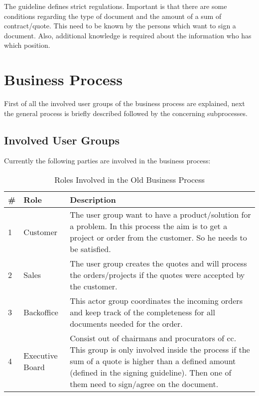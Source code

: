 The guideline defines strict regulations. Important is that there are some conditions regarding the type of document and the amount of a sum of contract/quote. This need to be known by the persons which want to sign a document. Also, additional knowledge is required about the information who has which position.

\section{Business Process} \label{sec:bp}
First of all the involved user groups of the business process are explained, next the general process is briefly described followed by the concerning subprocesses.

\subsection*{Involved User Groups}
Currently the following parties are involved in the business process: 
\begin{table}[h]
	\begin{tabular}{|p{0.25cm}|p{2cm}|p{14cm}|} \hline
		\rowcolor{Gray}\# & Role & Description \\ \hline
		1 & Customer & The user group want to have a product/solution for a problem. In this process the aim is to get a project or order from the customer. So he needs to be satisfied. \\ \hline
		2 & Sales & The user group creates the quotes and will process the orders/projects if the quotes were accepted by the customer. \\ \hline
		3 & Backoffice & This actor group coordinates the incoming orders and keep track of the completeness for all documents needed for the order. \\ \hline
		4 & Executive Board & Consist out of chairmans and procurators of \gls{cc}. This group is only involved inside the process if the sum of a quote is higher than a defined amount (defined in the signing guideline). Then one of them need to sign/agree on the document. \\ \hline
	\end{tabular}
	\caption{Roles Involved in the Old Business Process}
	\label{tab:bpRoles}
\end{table}

